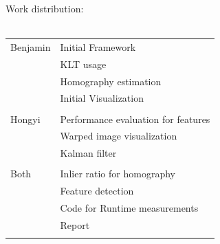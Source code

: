 \documentclass[10pt,conference,compsocconf]{IEEEtran}
\begin{document}
\appendix
Work distribution:\\\\
\begin{tabular}{l l}
Benjamin & Initial Framework \\
& KLT usage \\
& Homography estimation \\
& Initial Visualization \\
\\
Hongyi & Performance evaluation for features\\
& Warped image visualization\\
& Kalman filter \\
\\
Both & Inlier ratio for homography \\
& Feature detection \\
& Code for Runtime measurements\\
& Report\\
\\
\end{tabular} 
\end{document}
